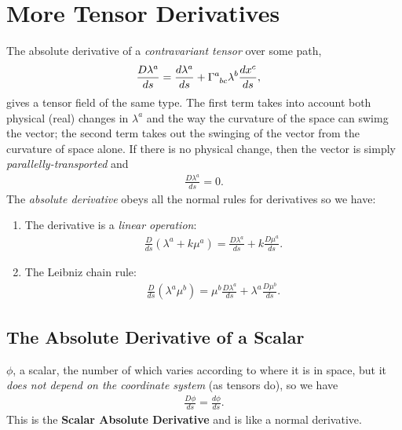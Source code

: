 \documentclass[a4paper, 11pt, normalem]{report}
\begin{document}
\chapter{More Tensor Derivatives}
The absolute derivative of a \emph{contravariant tensor} over some path,
\begin{align}
    \frac{D\lambda^a}{ds} &=\frac{d\lambda^a}{ds} +\tensor{\Gamma}{^a_{bc}}\lambda^b\frac{dx^c}{ds},
\end{align}
gives a tensor field of the same type.
The first term takes into account both physical (real) changes in $\lambda^a$ and the way the curvature of the space can swimg the vector; the second term takes out the swinging of the vector from the curvature of space alone.
If there is no physical change, then the vector is simply \emph{parallelly-transported} and
\begin{align}
    \frac{D\lambda^a}{ds} = 0.
\end{align}
The \emph{absolute derivative} obeys all the normal rules for derivatives so we have:
\begin{enumerate}
    \item The derivative is a \emph{linear operation}:
        \begin{align}
            \frac{D}{ds}\left(\lambda^a+ k\mu^a\right) = \frac{D\lambda^a}{ds} + k\frac{D\mu^a}{ds}.
        \end{align}
    \item The Leibniz chain rule:
        \begin{align}
            \frac{D}{ds}\left(\lambda^a\mu^b\right) = \mu^b\frac{D\lambda^a}{ds} + \lambda^a\frac{D\mu^b}{ds}.
        \end{align}
\end{enumerate}

\section{The Absolute Derivative of a Scalar}
$\phi$, a scalar, the number of which varies according to where it is in space, but it \emph{does not depend on the coordinate system} (as tensors do), so we have
\begin{align}
    \frac{D\phi}{ds} = \frac{d\phi}{ds}.
\end{align}
This is the \textbf{Scalar Absolute Derivative} and is like a normal derivative.
\end{document}
